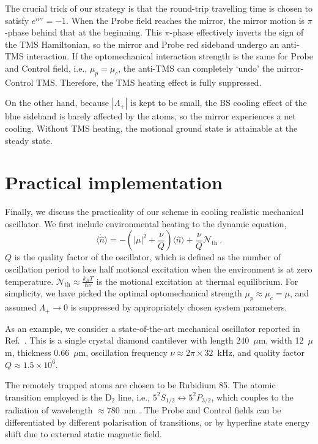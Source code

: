 \documentclass[aps, pra, reprint, amsmath, amssymb, groupedaddress, acknowledgments]{revtex4-1}
\begin{document}
The crucial trick of our strategy is that the round-trip travelling time is chosen to satisfy $e^{i\nu \tau}=-1$.  When the Probe field reaches the mirror, the mirror motion is $\pi$-phase behind that at the beginning.  This $\pi$-phase effectively inverts the sign of the TMS Hamiltonian, so the mirror and Probe red sideband undergo an anti-TMS interaction.  If the optomechanical interaction strength is the same for Probe and Control field, i.e., $\mu_p=\mu_c$, the anti-TMS can completely `undo' the mirror-Control TMS.  Therefore, the TMS heating effect is fully suppressed.  

On the other hand, because $|\Lambda_+|$ is kept to be small, the BS cooling effect of the blue sideband is barely affected by the atoms, so the mirror experiences a net cooling.  Without TMS heating, the motional ground state is attainable at the steady state.


\section{Practical implementation \label{sec:implement}}

Finally, we discuss the practicality of our scheme in cooling realistic mechanical oscillator.  We first include environmental heating to the dynamic equation,
\begin{equation}
\langle\dot{\hat{n}} \rangle =  - (|\mu|^2 + \frac{\nu}{Q}) \langle \hat{n}\rangle + \frac{\nu}{Q} \mathcal{N}_\textrm{th}~.
\end{equation}
$Q$ is the quality factor of the oscillator, which is defined as the number of oscillation period to lose half motional excitation when the environment is at zero temperature.  $\mathcal{N}_\textrm{th}\approx \frac{k_B T}{\hbar \nu}$ is the motional excitation at thermal equilibrium.  For simplicity, we have picked the optimal optomechanical strength $\mu_p \approx \mu_c = \mu$, and assumed $\Lambda_+\rightarrow 0$ is suppressed by appropriately chosen system parameters.  

As an example, we consider a state-of-the-art mechanical oscillator reported in Ref.~\cite{2014NatCo...5E3638T}.  This is a single crystal diamond cantilever with length 240~$\mu$m, width 12~$\mu$m, thickness 0.66~$\mu$m, oscillation frequency $\nu \approx 2\pi \times 32$~kHz, and quality factor $Q\approx 1.5 \times10^6$.  

The remotely trapped atoms are chosen to be Rubidium 85.  The atomic transition employed is the D$_2$ line, i.e., $5^2S_{1/2}\leftrightarrow 5^2P_{3/2}$, which couples to the radiation of wavelength $\approx 780$~nm \cite{atom_data}.  The Probe and Control fields can be differentiated by different polarisation of transitions, or by hyperfine state energy shift due to external static magnetic field.  
\end{document}
